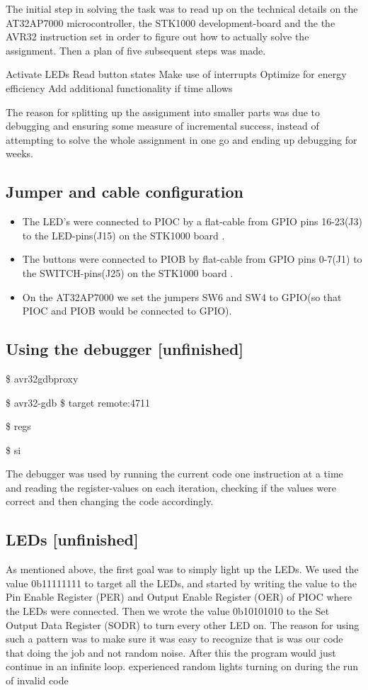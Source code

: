 The initial step in solving the task was to read up on the technical details on the AT32AP7000 microcontroller, the STK1000 development-board and the the AVR32 instruction set in order to figure out how to actually solve the assignment. Then a plan of five subsequent steps was made.

Activate LEDs
Read button states
Make use of interrupts
Optimize for energy efficiency
Add additional functionality if time allows

The reason for splitting up the assignment into smaller parts was due to debugging and ensuring some measure of incremental success, instead of attempting to solve the whole assignment in one go and ending up debugging for weeks.
\subsection*{Jumper and cable configuration}


\begin{itemize}
\item The LED’s were connected to PIOC by a flat-cable from GPIO pins 16-23(J3) to the LED-pins(J15) on the STK1000 board \cite[section~2.4.1]{kompendium}. 
\item The buttons were connected to PIOB by flat-cable from GPIO pins 0-7(J1) to the SWITCH-pins(J25) on the STK1000 board \cite[section~2.4.1]{kompendium}.
\item On the AT32AP7000 we set the jumpers SW6 and SW4 to GPIO(so that PIOC and PIOB would be connected to GPIO)\cite[table~2.3]{kompendium}.
\end{itemize}

\subsection*{Using the debugger [unfinished]}
\$ avr32gdbproxy

\$ avr32-gdb
\$ target remote:4711

\$ regs

\$ si

The debugger was used by running the current code one instruction at a time and reading the register-values on each iteration, checking if the values were correct and then changing the code accordingly.
\subsection*{LEDs [unfinished]}

As mentioned above, the first goal was to simply light up the LEDs. We used the value 0b11111111 to target all the LEDs, and started by writing the value to the Pin Enable Register (PER) and Output Enable Register (OER) of PIOC where the LEDs were connected. Then we wrote the value 0b10101010 to the Set Output Data Register (SODR) to turn every other LED on. The reason for using such a pattern was to make sure it was easy to recognize that is was our code that doing the job and not random noise. After this the program would just continue in an infinite loop. experienced random lights turning on during the run of invalid code
